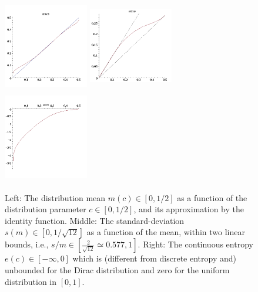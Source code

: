 \documentclass{article}
\begin{document}
\begin{figure}[!ht]
\centerline{
  \includegraphics[width=0.33\textwidth,height=4cm]{img/bcmed1-m}
  \includegraphics[width=0.33\textwidth,height=4cm]{img/bcmed1-s}
  \includegraphics[width=0.33\textwidth,height=4cm]{img/bcmed1-e}
}
  \caption{Left: The distribution mean $m(c) \in [0,1/2]$ as a function of the distribution parameter $c \in [0,1/2]$, and its approximation by the identity function. Middle: The standard-deviation $s(m) \in [0,1/\sqrt{12}]$ as a function of the mean, within two linear bounds, i.e., $s / m \in [\frac{2}{\sqrt{12}} \simeq 0.577, 1]$. Right: The continuous entropy $e(c) \in [-\infty,0]$ which is (different from discrete entropy and) unbounded for the Dirac distribution and zero for the uniform distribution in $[0, 1]$.}
  \label{bcmed1}
\end{figure}

\clearpage{\scriptsize  }

\fi
\end{document}
